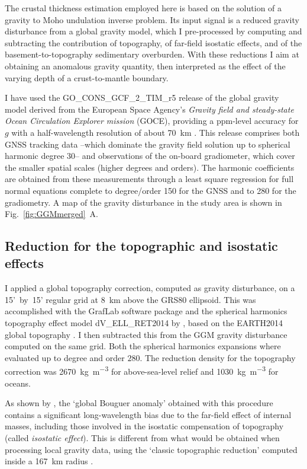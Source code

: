 The crustal thickness estimation employed here is based on the solution of a gravity to Moho undulation inverse problem.
Its input signal is a reduced gravity disturbance from a global gravity model, which I pre-processed by computing and subtracting the contribution of topography, of far-field isostatic effects, and of the basement-to-topography sedimentary overburden.
With these reductions I aim at obtaining an anomalous gravity quantity, then interpreted as the effect of the varying depth of a crust-to-mantle boundary.

I have used the {GO\_CONS\_GCF\_2\_TIM\_r5} release \parencites{Brockmann2014}{Pail2011GOCE}{GOCETIMr5datasheet} of the global gravity model derived from the European Space Agency's \textit{Gravity field and steady-state Ocean Circulation Explorer mission} (GOCE), providing a ppm-level accuracy for $g$ with a half-wavelength resolution of about 70~\si{\kilo \metre} \parencite{Floberghagen2011_goce}.
This release comprises both GNSS tracking data --which dominate the gravity field solution up to spherical harmonic degree 30-- and observations of the on-board gradiometer, which cover the smaller spatial scales (higher degrees and orders).
The harmonic coefficients are obtained from these measurements through a least square regression for full normal equations complete to degree/order 150 for the GNSS and to 280 for the gradiometry.
A map of the gravity disturbance in the study area is shown in Fig.~\ref{fig:GGMmerged}~A.

\subsection{Reduction for the topographic and isostatic effects}
\label{ss:Appl:GravTopoIso}
I applied a global topography correction, computed as gravity disturbance, on a 15'~by~15' regular grid at 8~\si{\kilo \metre} above the GRS80 ellipsoid.
This was accomplished with the GrafLab software package \parencites{bucha2013GrafLab} and the spherical harmonics topography effect model {dV\_ELL\_RET2014} by \textcite{Rexer2016}, based on the {EARTH2014} global topography \parencite{Hirt2015}.
I then subtracted this from the GGM gravity disturbance computed on the same grid.
Both the spherical harmonics expansions where evaluated up to degree and order $280$.
The reduction density for the topography correction was 2670~\si{\kilo \gram \per \cubic \metre} for above-sea-level relief and 1030~\si{\kilo \gram \per \cubic \metre} for oceans.

As shown by \textcite{Szwillus2016}, the `global Bouguer anomaly' obtained with this procedure contains a significant long-wavelength bias due to the far-field effect of internal masses, including those involved in the isostatic compensation of topography (called \textit{isostatic effect}).
This is different from what would be obtained when processing local gravity data, using the `classic topographic reduction' computed inside a 167~\si{\kilo \metre} radius \parencite{hayford1912}.

